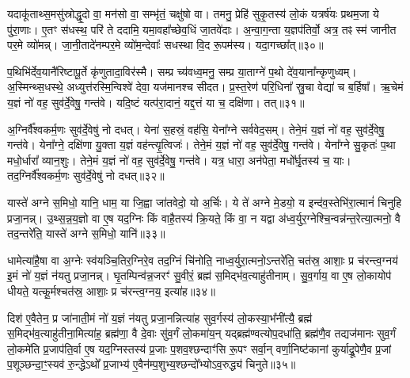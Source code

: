 {\anuvakamend[{पृ॒थि॒वीं य॑च्छ॒ यथ्स्व॑यमातृ॒ण्णा उ॑प॒धाय॑ धेह्यृ॒चाग्निश्चि॑नु॒ते त्रीणि॑ च॥७॥}]}

यदाकू॑ताथ्स॒मसु॑स्रोद्धृ॒दो वा॒ मन॑सो वा॒ सम्भृ॑तं॒ चक्षु॑षो वा। तमनु॒ प्रेहि॑ सुकृ॒तस्य॑ लो॒कं यत्रर्\mbox{}ष॑यः प्रथम॒जा ये पु॑रा॒णाः। ए॒तꣳ स॑धस्थ॒ परि॑ ते ददामि॒ यमा॒वहा᳚च्छेव॒धिं जा॒तवे॑दाः। अ॒न्वा॒ग॒न्ता य॒ज्ञप॑तिर्वो॒ अत्र॒ तꣴ स्म॑ जानीत पर॒मे व्यो॑मन्न्। जा॒नी॒तादे॑नम्पर॒मे व्यो॑म॒न्देवाः᳚ सधस्था वि॒द रू॒पम॑स्य। यदा॒गच्छा᳚त्॥३०॥

प॒थिभि॑र्देव॒यानै॑रिष्टापू॒र्ते कृ॑णुतादा॒विर॑स्मै। सम्प्र च्य॑वध्व॒मनु॒ सम्प्र या॒ताग्ने॑ प॒थो दे॑व॒याना᳚न्कृणुध्वम्। अ॒स्मिन्थ्स॒धस्थे॒ अध्युत्त॑रस्मि॒न्विश्वे॑ देवा॒ यज॑मानश्च सीदत। प्र॒स्त॒रेण॑ परि॒धिना᳚ स्रु॒चा वेद्या॑ च ब॒र्\mbox{}हिषा᳚। ऋ॒चेमं य॒ज्ञं नो॑ वह॒ सुव॑र्दे॒वेषु॒ गन्त॑वे। यदि॒ष्टं यत्प॑रा॒दानं॒ यद्द॒त्तं या च॒ दक्षि॑णा। तत्॥३१॥

अ॒ग्निर्वै᳚श्वकर्म॒णः सुव॑र्दे॒वेषु॑ नो दधत्। येना॑ स॒हस्रं॒ वह॑सि॒ येना᳚ग्ने सर्ववेद॒सम्। तेने॒मं य॒ज्ञं नो॑ वह॒ सुव॑र्दे॒वेषु॒ गन्त॑वे। येना᳚ग्ने॒ दक्षि॑णा यु॒क्ता य॒ज्ञं वह॑न्त्यृ॒त्विजः॑। तेने॒मं य॒ज्ञं नो॑ वह॒ सुव॑र्दे॒वेषु॒ गन्त॑वे। येना᳚ग्ने सु॒कृतः॑ प॒था मधो॒र्धारा᳚ व्यान॒शुः। तेने॒मं य॒ज्ञं नो॑ वह॒ सुव॑र्दे॒वेषु॒ गन्त॑वे। यत्र॒ धारा॒ अन॑पेता॒ मधो᳚र्घृ॒तस्य॑ च॒ याः। तद॒ग्निर्वै᳚श्वकर्म॒णः सुव॑र्दे॒वेषु॑ नो दधत्॥३२॥

{\anuvakamend[{आ॒गच्छा॒त्तद्व्या॑न॒शुस्तेने॒मं य॒ज्ञं नो॑ वह॒ सुव॑र्दे॒वेषु॒ गन्त॑वे॒ चतु॑र्दश च॥७॥}]}

यास्ते॑ अग्ने स॒मिधो॒ यानि॒ धाम॒ या जि॒ह्वा जा॑तवेदो॒ यो अ॒र्चिः। ये ते॑ अग्ने मे॒डयो॒ य इन्द॑व॒स्तेभि॑रा॒त्मानं॑ चिनुहि प्रजा॒नन्न्। उ॒थ्स॒न्न॒य॒ज्ञो वा ए॒ष यद॒ग्निः किं वाहै॒तस्य॑ क्रि॒यते॒ किं वा॒ न यद्वा अ॑ध्व॒र्युर॒ग्नेश्चि॒न्वन्न॑न्त॒रेत्या॒त्मनो॒ वै तद॒न्तरे॑ति॒ यास्ते॑ अग्ने स॒मिधो॒ यानि॑॥३३॥

धामेत्या॑है॒षा वा अ॒ग्नेः स्व॑यञ्चि॒तिर॒ग्निरे॒व तद॒ग्निं चि॑नोति॒ नाध्व॒र्युरा॒त्मनो॒\-ऽन्तरे॑ति॒ चत॑स्र॒ आशाः॒ प्र च॑रन्त्व॒ग्नय॑ इ॒मं नो॑ य॒ज्ञं न॑यतु प्रजा॒नन्न्। घृ॒तम्पिन्व॑न्न॒जरꣳ॑ सु॒वीरं॒ ब्रह्म॑ स॒मिद्भ॑व॒त्याहु॑तीनाम्। सु॒व॒र्गाय॒ वा ए॒ष लो॒कायोप॑ धीयते॒ यत्कू॒र्मश्चत॑स्र॒ आशाः॒ प्र च॑रन्त्व॒ग्नय॒ इत्या॑ह॥३४॥

दिश॑ ए॒वैतेन॒ प्र जा॑नाती॒मं नो॑ य॒ज्ञं न॑यतु प्रजा॒नन्नित्या॑ह सुव॒र्गस्य॑ लो॒कस्या॒भ᳚नी॑त्यै॒ ब्रह्म॑ स॒मिद्भ॑व॒त्याहु॑तीना॒मित्या॑ह॒ ब्रह्म॑णा॒ वै दे॒वाः सु॑व॒र्गं लो॒कमा॑य॒न् यद्ब्रह्म॑ण्वत्योप॒दधा॑ति॒ ब्रह्म॑णै॒व तद्यज॑मानः सुव॒र्गं लो॒कमे॑ति प्र॒जाप॑ति॒र्वा ए॒ष यद॒ग्निस्तस्य॑ प्र॒जाः प॒शव॒श्छन्दाꣳ॑सि रू॒पꣳ सर्वा॒न् वर्णा॒निष्ट॑कानां कुर्याद्रू॒पेणै॒व प्र॒जां प॒शूञ्छन्दा॒ꣳ॒स्यव॑ रु॒न्द्धे\-ऽथो᳚ प्र॒जाभ्य॑ ए॒वैन॑म्प॒शुभ्य॒श्छन्दो᳚भ्यो\-ऽव॒रुद्ध्य॑ चिनुते॥३५॥

